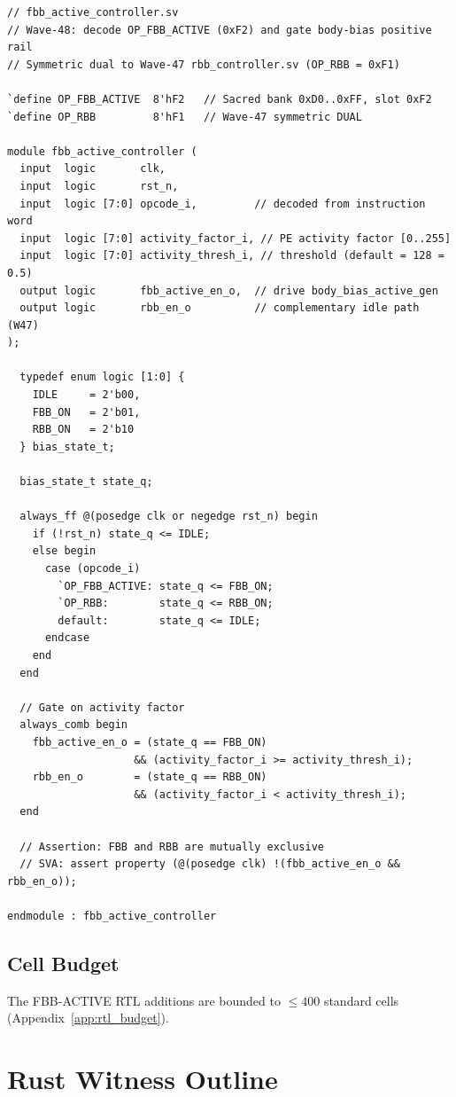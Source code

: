 \documentclass[12pt,a4paper]{report}
\theoremstyle{plain}
\theoremstyle{definition}
\theoremstyle{remark}
\begin{document}
\begin{lstlisting}[style=verilog,
  caption={fbb\_active\_controller.sv (decodes OP\_FBB\_ACTIVE = 0xF2).}]
// fbb_active_controller.sv
// Wave-48: decode OP_FBB_ACTIVE (0xF2) and gate body-bias positive rail
// Symmetric dual to Wave-47 rbb_controller.sv (OP_RBB = 0xF1)

`define OP_FBB_ACTIVE  8'hF2   // Sacred bank 0xD0..0xFF, slot 0xF2
`define OP_RBB         8'hF1   // Wave-47 symmetric DUAL

module fbb_active_controller (
  input  logic       clk,
  input  logic       rst_n,
  input  logic [7:0] opcode_i,         // decoded from instruction word
  input  logic [7:0] activity_factor_i, // PE activity factor [0..255]
  input  logic [7:0] activity_thresh_i, // threshold (default = 128 = 0.5)
  output logic       fbb_active_en_o,  // drive body_bias_active_gen
  output logic       rbb_en_o          // complementary idle path (W47)
);

  typedef enum logic [1:0] {
    IDLE     = 2'b00,
    FBB_ON   = 2'b01,
    RBB_ON   = 2'b10
  } bias_state_t;

  bias_state_t state_q;

  always_ff @(posedge clk or negedge rst_n) begin
    if (!rst_n) state_q <= IDLE;
    else begin
      case (opcode_i)
        `OP_FBB_ACTIVE: state_q <= FBB_ON;
        `OP_RBB:        state_q <= RBB_ON;
        default:        state_q <= IDLE;
      endcase
    end
  end

  // Gate on activity factor
  always_comb begin
    fbb_active_en_o = (state_q == FBB_ON)
                    && (activity_factor_i >= activity_thresh_i);
    rbb_en_o        = (state_q == RBB_ON)
                    && (activity_factor_i < activity_thresh_i);
  end

  // Assertion: FBB and RBB are mutually exclusive
  // SVA: assert property (@(posedge clk) !(fbb_active_en_o && rbb_en_o));

endmodule : fbb_active_controller
\end{lstlisting}

\subsection{Cell Budget}

The FBB-ACTIVE RTL additions are bounded to $\leq 400$ standard cells (Appendix~\ref{app:rtl_budget}).

\section{Rust Witness Outline}
\label{sec:rust}
\end{document}
